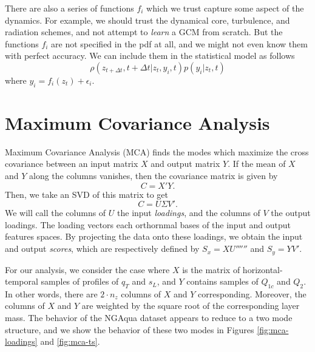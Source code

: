 \documentclass{report}
\begin{document}
There are also a series of functions $f_i$ which we trust capture some aspect of
the dynamics. 
For example, we should trust the dynamical core, turbulence, and radiation
schemes, and not attempt to \emph{learn} a GCM from scratch.
But the functions $f_i$ are not specified in the pdf at all, and we might not
even know them with perfect accuracy. We can include them in the statistical
model as follows
\[\rho(z_{t+\Delta t}, t+ \Delta t| z_t, y_i, t) p(y_i|z_t, t) \]
where $y_i = f_i(z_t) + \epsilon_i$.




\section{Maximum Covariance Analysis}
\label{sec:mca}

Maximum Covariance Analysis (MCA) finds the modes which maximize the cross
covariance between an input matrix $X$ and output matrix $Y$. 
If the mean of $X$ and $Y$ along the columns vanishes, then the covariance
matrix is given by
\[C=X'Y.\]
Then, we take an SVD of this matrix to get
\[C=U\Sigma V'.\] We will call the columns of $U$ the input \emph{loadings}, and
the columns of $V$ the output loadings. 
The loading vectors each orthornmal bases of the input and output features
spaces. 
By projecting the data onto these loadings, we obtain the input and output
\emph{scores}, which are respectively defined by $S_x = X U''''''$ and $S_y=YV'$. 

For our analysis, we consider the case where $X$ is the matrix of
horizontal-temporal samples of profiles of $q_T$ and $s_L$, and $Y$ contains
samples of $Q_{1c}$ and $Q_2$. In other words, there are $2\cdot n_z$ columns of
$X$ and $Y$ corresponding. Moreover, the columns of $X$ and $Y$ are weighted by
the square root of the corresponding layer mass. The behavior of the NGAqua
dataset appears to reduce to a two mode structure, and we show the behavior of
these two modes in Figures \ref{fig:mca-loadings} and \ref{fig:mca-ts}.
\end{document}

